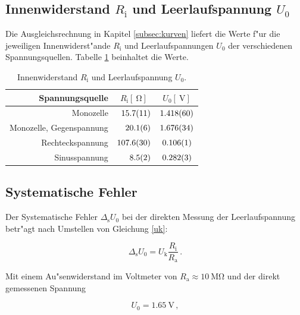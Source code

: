 	\clearpage

	\subsection{Innenwiderstand $R_\mathrm{i}$ und Leerlaufspannung $U_0$}
	\label{subsec:ri-u0}
		Die Ausgleichsrechnung in Kapitel \ref{subsec:kurven} liefert die Werte f"ur die jeweiligen Innenwiderst"ande $R_\mathrm{i}$ und Leerlaufspannungen $U_0$ der verschiedenen Spannungsquellen.
		Tabelle \ref{table:ri-u0} beinhaltet die Werte.

		\begin{table}[h!]
			\begin{center}
				\caption{Innenwiderstand $R_\mathrm{i}$ und Leerlaufspannung $U_0$. \label{table:ri-u0}}
				\begin{tabular}{|r|r|c|}
					\hline
						Spannungsquelle & \multicolumn{1}{|c|}{$R_\mathrm{i} [\SI{}{\ohm}]$} & $U_0 [\SI{}{\volt}]$ \\ 
					\hline 
					\hline
						Monozelle & $\SI{15.7 (11)}{}$ & $\SI{1.418 (60)}{}$ \\
						Monozelle, Gegenspannung & $\SI{20.1 (6)}{}$ & $\SI{1.676 (34)}{}$ \\
						Rechteckspannung & $\SI{107.6 (30)}{}$ & $\SI{.106 (1)}{}$ \\
						Sinusspannung & $\SI{8.5 (2)}{}$ & $\SI{.282 (3)}{}$ \\ 
					\hline 
				\end{tabular}
			\end{center}
		\end{table}

	\subsection{Systematische Fehler}
	\label{subsec:fehler}
		Der Systematische Fehler $\Delta_\mathrm{s} U_0$ bei der direkten Messung der Leerlaufspannung betr"agt nach Umstellen von Gleichung \eqref{uk}:

		\begin{equation*}
			\Delta_\mathrm{s} U_0 = U_\mathrm{k} \frac{R_\mathrm{i}}{R_\mathrm{a}} \,.
		\end{equation*}

		Mit einem Au"senwiderstand im Voltmeter von $R_\mathrm{a} \approx \SI{10}{\mega \ohm}$ und der direkt gemessenen Spannung

		\begin{equation*}
			U_0 = \SI{1.65}{\volt} \,,
		\end{equation*}
		
